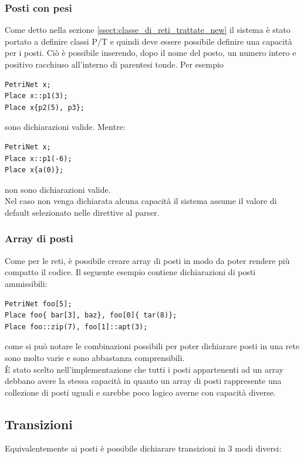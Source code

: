 \documentclass[italian,12pt]{book}
\begin{document}
\subsubsection{Posti con pesi}
Come detto nella sezione \ref{ssect:classe_di_reti_trattate_new} il sistema è stato portato a definire 
classi P/T e quindi deve essere possibile definire una capacità per i posti. Ciò è possibile inserendo, dopo il 
nome del posto, un numero intero e positivo racchiuso all'interno di parentesi tonde. Per esempio
\begin{verbatim}PetriNet x;
Place x::p1(3);
Place x{p2(5), p3};
\end{verbatim}
sono dichiarazioni valide. Mentre:
\begin{verbatim}PetriNet x;
Place x::p1(-6);
Place x{a(0)};
\end{verbatim}
non sono dichiarazioni valide.\\
Nel caso non venga dichiarata alcuna capacità il sistema assume il
valore di default selezionato nelle direttive al parser.

\subsubsection{Array di posti}
Come per le reti, è possibile creare array di posti in modo da poter rendere più compatto il codice.
Il seguente esempio contiene dichiarazioni di posti ammissibili:
\begin{verbatim}PetriNet foo[5];
Place foo{ bar[3], baz}, foo[0]{ tar(8)};
Place foo::zip(7), foo[1]::apt(3);
\end{verbatim}
come si può notare le combinazioni possibili per poter dichiarare posti in una rete sono molto varie
e sono abbastanza comprensibili.\\
È stato scelto nell'implementazione che tutti i posti appartenenti ad un array debbano avere la stessa capacità 
in quanto un array di posti rappresente una collezione di posti uguali e sarebbe poco logico averne con capacità 
diverse.

\subsection{Transizioni}
Equivalentemente ai posti è possibile dichiarare transizioni in 3 modi diversi:
\end{document}
